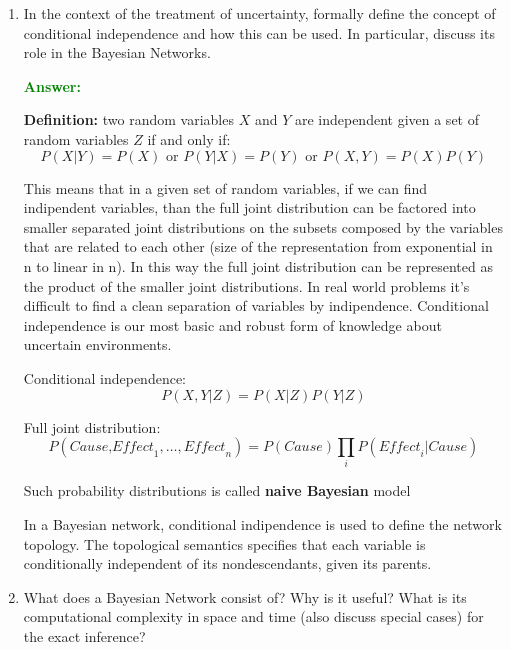 \documentclass[12pt]{article}
\begin{document}
\begin{enumerate}[label=\textbf{U.\arabic*}]
    \item\label{q:cond_ind} In the context of the treatment of uncertainty, formally define the concept of conditional independence and how this can be used. 
    In particular, discuss its role in the Bayesian Networks.

    \textcolor{green}{\textbf{Answer:}}

    \textbf{Definition:} two random variables $X$ and $Y$ are independent given a set of random variables $Z$ if and only if:
    \begin{equation}\label{eq:prob_ind}
        P(X|Y) = P(X) \text{ or } P(Y|X) = P(Y) \text{ or } P(X,Y) = P(X)P(Y)
    \end{equation}

    This means that in a given set of random variables, if we can find indipendent variables, than the full joint distribution
    can be factored into smaller separated joint distributions on the subsets composed by the variables that are related to each other
    (size of the representation from exponential in n to linear in n).
    In this way the full joint distribution can be represented as the product of the smaller joint distributions.
    In real world problems it's difficult to find a clean separation of variables by indipendence.
    Conditional independence is our most basic and robust form of knowledge about uncertain environments.

    Conditional independence:
    \begin{equation}\label{eq:prob_cond_ind}
        P(X,Y|Z) = P(X|Z)P(Y|Z)
    \end{equation}

    Full joint distribution:
    \begin{equation}
        P(\textit{Cause,Effect}_1,\ldots,\textit{Effect}_n) = P(Cause)\prod_{i} P(\textit{Effect}_i|Cause)
    \end{equation}

    Such probability distributions is called \textbf{naive Bayesian} model

    In a Bayesian network, conditional indipendence is used to define the network topology.
    The topological semantics specifies that each variable is conditionally independent of its nondescendants, given its parents.

    \item\label{q:Bayesian-Net} What does a Bayesian Network consist of? 
    Why is it useful?
    What is its computational complexity in space and time (also discuss special cases) for the exact inference?


\end{enumerate}
\end{document}
